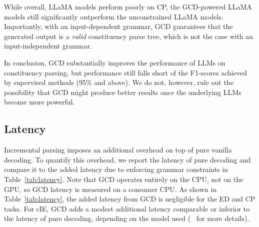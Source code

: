 While overall, LLaMA models perform poorly on CP, the GCD-powered LLaMA models still significantly outperform the unconstrained LLaMA models.
Importantly, with an input\hyp dependent grammar, GCD guarantees that the generated output is a \textit{valid} constituency parse tree, which is not the case with an input-independent grammar.
%

In conclusion, GCD substantially improves the performance of LLMs on constituency parsing, but performance still falls short of the F1-scores achieved by supervised methods (95\% and above).
We do not, however, rule out the possibility that GCD might produce better results once the underlying LLMs become more powerful.

\subsection{Latency}{\label{subsec:latency}}



Incremental parsing imposes an additional overhead on top of pure vanilla decoding.
To quantify this overhead, we report the latency of pure decoding and compare it to the added latency due to enforcing grammar constraints
in Table~\ref{tab:latency}.
Note that GCD operates entirely on the CPU, not on the GPU, so GCD latency is measured on a consumer CPU.
%
As shown in Table~\ref{tab:latency}, the added latency from GCD is negligible for the ED and CP tasks.
For cIE, GCD adds a modest additional latency comparable or inferior to the latency of pure decoding, depending on the model used (\cf\  for more details).

